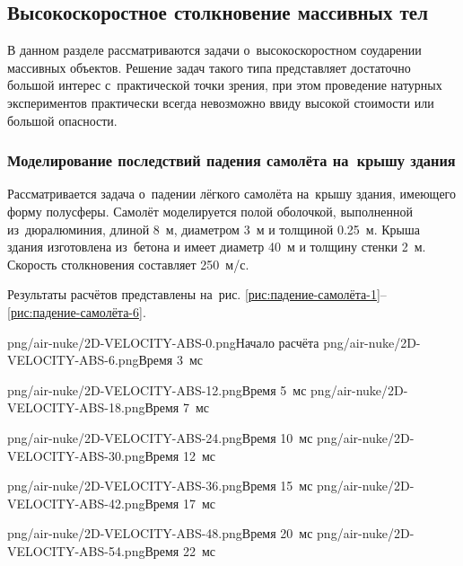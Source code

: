 \documentclass[thesis.tex]{subfiles}
\begin{document}
\clearpage
\subsection{Высокоскоростное столкновение массивных тел}

В данном разделе рассматриваются задачи о~высокоскоростном соударении массивных объектов. Решение задач такого
типа представляет достаточно большой интерес с~практической точки зрения, при этом проведение натурных экспериментов
практически всегда невозможно ввиду высокой стоимости или большой опасности.

\subsubsection[Моделирование последствий падения самолёта\\на~крышу здания]{Моделирование последствий падения самолёта на~крышу здания}

Рассматривается задача о~падении лёгкого самолёта на~крышу здания, имеющего форму полусферы. Самолёт моделируется полой
оболочкой, выполненной из~дюралюминия, длиной 8~м, диаметром 3~м и толщиной 0.25~м. Крыша здания изготовлена из~бетона
и имеет диаметр 40~м и толщину стенки 2~м. Скорость столкновения составляет 250~м/с.

Результаты расчётов представлены на~рис.  \ref{рис:падение-самолёта-1}--\ref{рис:падение-самолёта-6}.

        {png/air-nuke/2D-VELOCITY-ABS-0.png}{Начало расчёта}
        {png/air-nuke/2D-VELOCITY-ABS-6.png}{Время 3~мс}

        {png/air-nuke/2D-VELOCITY-ABS-12.png}{Время 5~мс}
        {png/air-nuke/2D-VELOCITY-ABS-18.png}{Время 7~мс}

        {png/air-nuke/2D-VELOCITY-ABS-24.png}{Время 10~мс}
        {png/air-nuke/2D-VELOCITY-ABS-30.png}{Время 12~мс}

        {png/air-nuke/2D-VELOCITY-ABS-36.png}{Время 15~мс}
        {png/air-nuke/2D-VELOCITY-ABS-42.png}{Время 17~мс}

        {png/air-nuke/2D-VELOCITY-ABS-48.png}{Время 20~мс}
        {png/air-nuke/2D-VELOCITY-ABS-54.png}{Время 22~мс}
\end{document}
